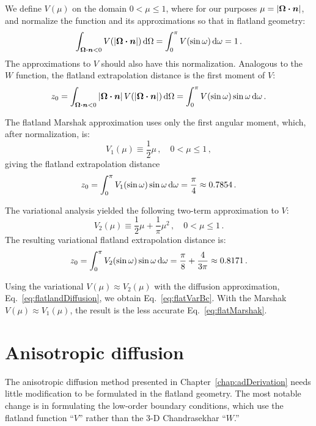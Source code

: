 We define $V(\mu)$ on the domain $0 < \mu \le 1$, where for our purposes $\mu =
\left| \bm{\Omega} \bm{\cdot} \bm{n} \right|$, and normalize the function and its
approximations so that in flatland geometry:
\begin{equation*}
  \int_{\bm{\Omega}\bm{\cdot}\bm{n} < 0} V( \left| \bm{\Omega}\bm{\cdot}\bm{n} \right|) \mathop{}\!\mathrm{d}\Omega
  = \int_{0}^{\pi} V(\sin\omega) \mathop{}\!\mathrm{d}\omega
  = 1 \,.
\end{equation*}
The approximations to $V$ should also have this normalization. Analogous to the
$W$ function, the flatland extrapolation distance is the first moment of $V$:
\begin{equation*}
  z_0 = \int_{\bm{\Omega}\bm{\cdot}\bm{n} < 0} \left| \bm{\Omega}\bm{\cdot}\bm{n} \right|
    V( \left| \bm{\Omega}\bm{\cdot}\bm{n} \right|) \mathop{}\!\mathrm{d}\Omega
  = \int_{0}^{\pi} V(\sin\omega) \sin\omega \mathop{}\!\mathrm{d}\omega \,.
\end{equation*}

The flatland Marshak approximation uses only the first angular moment, which,
after normalization, is:
\begin{equation}\label{eq:flatV1}
  V_1(\mu) \equiv \frac{1}{2} \mu \,,
  \quad 0 < \mu \le 1 \,,
\end{equation}
giving the flatland extrapolation distance
\begin{equation*}
 z_0 = \int_{0}^{\pi} V_1(\sin\omega) \sin\omega \mathop{}\!\mathrm{d}\omega
  = \frac{\pi}{4} \approx 0.7854 \,.
\end{equation*}

The variational analysis yielded the following two-term approximation to $V$:
\begin{equation}\label{eq:flatV2}
  V_2(\mu) \equiv \frac{1}{2} \mu + \frac{1}{\pi}\mu^2 \,,
  \quad 0 < \mu \le 1 \,.
\end{equation}
The resulting variational flatland extrapolation distance is:
\begin{equation*}
 z_0 = \int_{0}^{\pi} V_2(\sin\omega) \sin\omega \mathop{}\!\mathrm{d}\omega
  = \frac{\pi}{8} + \frac{4}{3\pi} \approx 0.8171\,.
\end{equation*}

Using the variational $V(\mu)\approx V_2(\mu)$ with the diffusion
approximation, Eq.~\eqref{eq:flatlandDiffusion}, we obtain
Eq.~\eqref{eq:flatVarBc}. With the Marshak $V(\mu)\approx V_1(\mu)$, the result
is the less accurate Eq.~\eqref{eq:flatMarshak}.

\section{Anisotropic diffusion}
The anisotropic diffusion method presented in
Chapter~\ref{chap:adDerivation} needs little modification to be formulated
in the flatland geometry. The most notable change is in formulating the
low-order boundary conditions, which use the flatland function ``$V$'' rather
than the 3-D Chandrasekhar ``$W$.''

